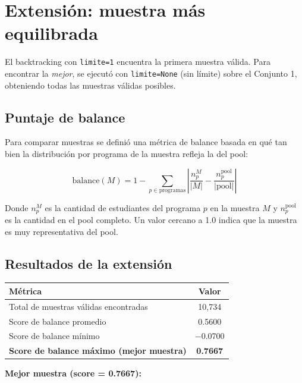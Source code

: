 \documentclass[12pt, a4paper]{article}
\begin{document}
\section{Extensión: muestra más equilibrada}

El backtracking con \texttt{limite=1} encuentra la primera muestra válida. Para encontrar la \emph{mejor}, se ejecutó con \texttt{limite=None} (sin límite) sobre el Conjunto 1, obteniendo todas las muestras válidas posibles.

\subsection{Puntaje de balance}

Para comparar muestras se definió una métrica de balance basada en qué tan bien la distribución por programa de la muestra refleja la del pool:

\[
  \text{balance}(M) = 1 - \sum_{p \in \text{programas}} \left|\frac{n_p^{M}}{|M|} - \frac{n_p^{\text{pool}}}{|\text{pool}|}\right|
\]

Donde $n_p^M$ es la cantidad de estudiantes del programa $p$ en la muestra $M$ y $n_p^{\text{pool}}$ es la cantidad en el pool completo. Un valor cercano a 1.0 indica que la muestra es muy representativa del pool.

\subsection{Resultados de la extensión}

\begin{center}
\begin{tabular}{lc}
  \toprule
  \textbf{Métrica} & \textbf{Valor} \\
  \midrule
  Total de muestras válidas encontradas & 10{,}734 \\
  Score de balance promedio             & 0.5600 \\
  Score de balance mínimo              & $-$0.0700 \\
  \textbf{Score de balance máximo (mejor muestra)} & \textbf{0.7667} \\
  \bottomrule
\end{tabular}
\end{center}

\textbf{Mejor muestra (score = 0.7667):}
\end{document}
